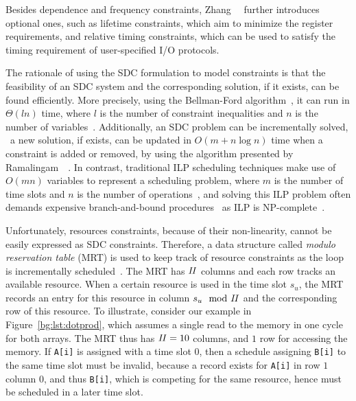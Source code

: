 Besides dependence and frequency constraints, Zhang~\etal~\cite{zhang13}
further introduces optional ones, such as lifetime constraints, which aim to
minimize the register requirements, and relative timing constraints, which can
be used to satisfy the timing requirement of user-specified I/O protocols.

The rationale of using the SDC formulation to model constraints is that
the feasibility of an SDC system and the corresponding solution, if it
exists, can be found efficiently.  More precisely, using the Bellman-Ford
algorithm~\cite{schrijver05}, it can run in $\Theta(l n)$ time, where
$l$ is the number of constraint inequalities and $n$ is the number of
variables~\cite{zhang13}.  Additionally, an SDC problem can be incrementally
solved, \ie~a new solution, if exists, can be updated in $O(m + n \log n)$
time when a constraint is added or removed, by using the algorithm presented
by Ramalingam~\etal~\cite{ramalingam99}.  In contrast, traditional ILP
scheduling techniques make use of $O(mn)$ variables to represent a scheduling
problem, where $m$ is the number of time slots and $n$ is the number of
operations~\cite{hwang91}, and solving this ILP problem often demands expensive
branch-and-bound procedures~\cite{zhang13} as ILP is NP-complete~\cite{karp10}.

Unfortunately, resources constraints, because of their non-linearity, cannot
be easily expressed as SDC constraints.  Therefore, a data structure called
\emph{modulo reservation table} (MRT) is used to keep track of resource
constraints as the loop is incrementally scheduled~\cite{canis14}.  The MRT
has $\mathit{II}$ columns and each row tracks an available resource.  When a certain
resource is used in the time slot $s_u$, the MRT records an entry for this
resource in column $s_u \mod {\mathit{II}}$ and the corresponding row of this resource.
To illustrate, consider our example in Figure~\ref{bg:lst:dotprod}, which
assumes a single read to the memory in one cycle for both arrays.  The MRT thus
has $\mathit{II} = 10$ columns, and $1$ row for accessing the memory.  If \verb|A[i]|
is assigned with a time slot $0$, then a schedule assigning \verb|B[i]| to the
same time slot must be invalid, because a record exists for \verb|A[i]| in row
$1$ column $0$, and thus \verb|B[i]|, which is competing for the same resource,
hence must be scheduled in a later time slot.


